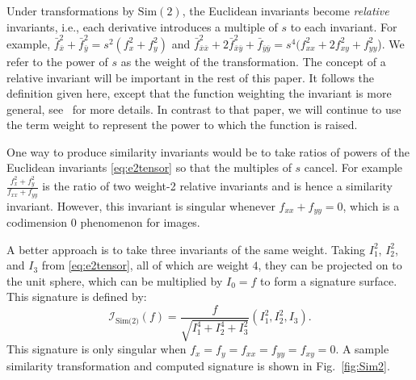 \documentclass{artjlt}
\begin{document}
Under transformations by $\text{Sim}(2)$, the Euclidean invariants become
\emph{relative} invariants, i.e., each derivative introduces a multiple of $s$ to
each invariant. For example, $\bar{f}_{\bar x}^2 + \bar{f}_{\bar y}^2 =
s^2(f_x^2 + f_y^2)$ and $\bar{f}_{\bar x \bar x}^2 + 2\bar{f}_{\bar x \bar
y}^2 + \bar{f}_{\bar y \bar y} = s^4 (f_{xx}^2 + 2f_{xy}^2 + f_{yy}^2$). We
refer to the power of $s$ as the weight of the transformation. The concept of a 
relative invariant will be important in the rest of this paper. It follows the 
definition given here, except that the function weighting the invariant is more 
general, see~\citet{Fels1997} for more details. In contrast to that paper, 
we will continue to use the term weight to represent the power to which the function is raised.

One way to produce similarity invariants would be to take ratios of powers
of the Euclidean invariants \eqref{eq:e2tensor} so that the multiples of
$s$ cancel. For example $\frac{f_x^2 + f_y^2}{f_{xx} + f_{yy}}$ is the
ratio of two weight-2 relative invariants and is hence a similarity
invariant. However, this invariant is singular whenever $f_{xx} + f_{yy} =
0$, which is a codimension 0 phenomenon for images.

A better approach is to take three invariants of the same weight.
Taking $I_1^2$, $I_2^2$, and $I_3$ from \eqref{eq:e2tensor}, all of which are
weight $4$, they can be projected on to the unit sphere, which can be
multiplied by $I_0 = f$ to form a signature surface. This signature is
defined by:
\begin{equation}
    \label{eq:sim2signature}
\mathcal{I}_{\text{Sim(2)}}(f) = \frac{f}{\sqrt{I_1^4 + I_2^4 + I_3^2}}(I_1^2, I_2^2,
        I_3) .
\end{equation}
This signature is only singular when $f_x = f_y = f_{xx} = f_{yy} = f_{xy}
= 0$. A sample similarity transformation and computed signature is shown in
Fig.~\ref{fig:Sim2}.
\end{document}
